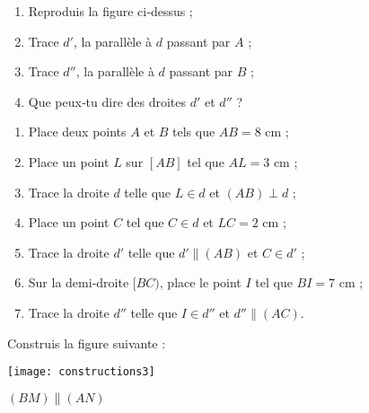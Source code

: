 \begin{exercice}
 \begin{center}
\end{center}
\begin{enumerate}
 \item Reproduis la figure ci‑dessus ;
 \item Trace $d'$, la parallèle à $d$ passant par $A$ ;
 \item Trace $d''$, la parallèle à $d$ passant par $B$ ;
 \item Que peux‑tu dire des droites $d'$ et $d''$ ?
 \end{enumerate}
\end{exercice}


\newpage



\begin{exercice}
\begin{enumerate}
 \item Place deux points $A$ et $B$ tels que $AB = 8$ cm ;
 \item Place un point $L$ sur $[AB]$ tel que $AL = 3$ cm ;
 \item Trace la droite $d$ telle que $L \in d$ et $(AB) \perp d$ ;
 \item Place un point $C$ tel que $C \in d$ et $LC = 2$ cm ;
 \item Trace la droite $d'$ telle que $d' \parallel (AB)$ et $C \in d'$ ;
 \item Sur la demi‑droite $[BC)$, place le point $I$ tel que $BI = 7$ cm ;
 \item Trace la droite $d''$ telle que $I \in d''$ et $d'' \parallel (AC)$.
 \end{enumerate}
\end{exercice}


\begin{exercice}
Construis la figure suivante : \\[0.75em]
\begin{minipage}[c]{0.2\textwidth}
\texttt{[image: constructions3]}
 \end{minipage} \hfill%
 \begin{minipage}[c]{0.2\textwidth}
 $(BM) \parallel (AN)$
  \end{minipage} \\
\end{exercice}


